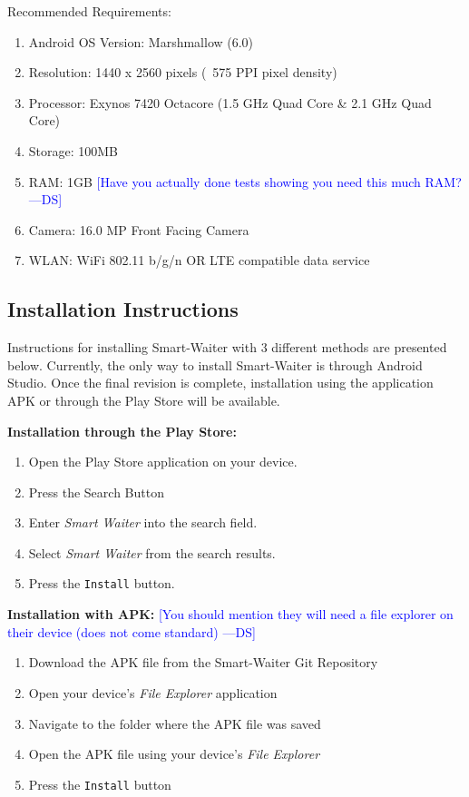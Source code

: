 \documentclass[12pt, titlepage]{article}
\newcommand{\authornote}[3]{\textcolor{#1}{[#3 ---#2]}}
\newcommand{\authornote}[3]{}
\newcommand{\ds}[1]{\authornote{blue}{DS}{#1}}
\begin{document}
Recommended Requirements:
\begin{enumerate}
\item Android OS Version: Marshmallow (6.0)
	\item Resolution: 1440 x 2560 pixels (~575 PPI pixel density)
	\item Processor: Exynos 7420 Octacore (1.5 GHz Quad Core \& 2.1 GHz Quad Core)
	\item Storage: 100MB
	\item RAM: 1GB \ds{Have you actually done tests showing you need this much RAM?}
	\item Camera: 16.0 MP Front Facing Camera
	\item WLAN: WiFi 802.11 b/g/n OR LTE compatible data service	
\end{enumerate}

\subsection{Installation Instructions}
Instructions for installing Smart-Waiter with 3 different methods are presented below. Currently, the only way to install Smart-Waiter is through Android Studio. Once the final revision is complete, installation using the application APK or through the Play Store will be available.

\textbf{\newline Installation through the Play Store:}
	\begin{enumerate}
		\item Open the Play Store application on your device.
		\item Press the Search Button
		\item Enter \emph{Smart Waiter} into the search field.
		\item Select \emph{Smart Waiter} from the search results.
		\item Press the \texttt{Install} button.		
	\end{enumerate}

\textbf{\newline Installation with APK:}
	\ds{You should mention they will need a file explorer on their device (does not come standard)}
	\begin{enumerate}
		\item Download the APK file from the Smart-Waiter Git Repository
		\item Open your device's \emph{File Explorer} application
		\item Navigate to the folder where the APK file was saved
		\item Open the APK file using your device's \emph{File Explorer}
		\item Press the \texttt{Install} button
	\end{enumerate}
\end{document}
